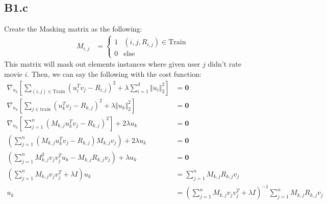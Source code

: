 \documentclass[]{article}
\begin{document}
    \subsection*{B1.c}
        Create the Masking matrix as the following: 
        \begin{align*}\tag{B1.c.1}\label{eqn:B1.c.1}
            M_{i, j} &= \begin{cases}
                1 & (i, j, R_{i, j}) \in \text{Train}
                \\
                0 & \text{else} 
            \end{cases}
        \end{align*}
        This matrix will mask out elements instances where given user $j$ didn't rate movie $i$. Then, we can say the following with the cost function: 
        \begin{align*}\tag{B1.c.2}\label{eqn:B1.c.2}
            \nabla_{u_k} \left[
                \sum_{(i, j)\in \text{Train}}^{}
                    (u_i^Tv_j - R_{i, j})^2
                +
                \lambda \sum_{i = 1}^{d}
                    \Vert u_i\Vert_2^2
            \right] &= \mathbf{0}
            \\
            \nabla_{u_k}\left[
                \sum_{j\in \text{train}}^{}
                    (u_k^T v_j - R_{k,j})^2
                +
                \lambda \Vert u_k\Vert_2^2
            \right] &= \mathbf{0}
            \\
            \nabla_{u_k} \left[
                \sum_{j = 1}^{n}
                    (M_{k, j}u_k^Tv_j - R_{k, j})^2
            \right] + 2\lambda u_k &= \mathbf{0}
            \\
            \left(
                \sum_{j = 1}^{n}
                    (M_{k, j}u_k^Tv_j - R_{k, j})M_{k, j}v_j
            \right) + 2\lambda u_k 
                &= \mathbf{0}
            \\
            \left(
                \sum_{j = 1}^{n} 
                M_{k, j}^2v_jv_j^Tu_k - M_{k, j}R_{k, j}v_j
            \right) + \lambda u_k 
            &= \mathbf{0}
            \\
            \left(
                \sum_{j = 1}^{n} 
                    M_{k, j}v_jv_j^T
                + \lambda I
            \right)u_k 
            &= \sum_{j = 1}^{n}M_{k,j}R_{k,j}v_j
            \\
            u_k &= \left(
                \sum_{j = 1}^{n} 
                    M_{k, j}v_jv_j^T
                + \lambda I
            \right)^{-1}\sum_{j = 1}^{n}M_{k,j}R_{k,j}v_j
        \end{align*}
\end{document}
